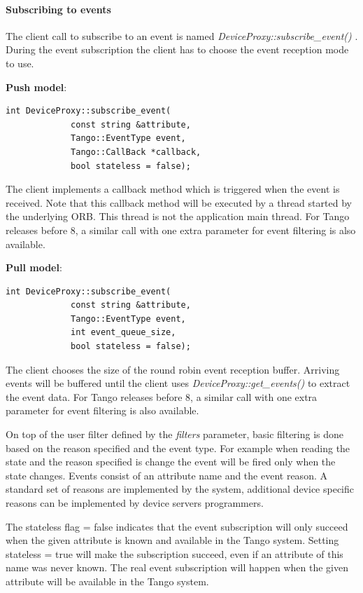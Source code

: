 \paragraph{Subscribing to events}

The client call to subscribe to an event is named \emph{DeviceProxy::subscribe\_event()}
. During the event subscription the client has to choose the event
reception mode to use. 

\textbf{Push model}:
\begin{verbatim}
int DeviceProxy::subscribe_event( 
             const string &attribute, 
             Tango::EventType event, 
             Tango::CallBack *callback,
             bool stateless = false);
\end{verbatim}
The client implements a callback method which is triggered when the
event is received. Note that this callback method will be executed
by a thread started by the underlying ORB. This thread is not the
application main thread. For Tango releases before 8, a similar call
with one extra parameter for event filtering is also available.

\textbf{Pull model}:
\begin{verbatim}
int DeviceProxy::subscribe_event( 
             const string &attribute, 
             Tango::EventType event, 
             int event_queue_size,
             bool stateless = false);
\end{verbatim}
The client chooses the size of the round robin event reception buffer.
Arriving events will be buffered until the client uses \emph{DeviceProxy::get\_events()}
to extract the event data. For Tango releases before 8, a similar
call with one extra parameter for event filtering is also available.

On top of the user filter defined by the \emph{filters} parameter,
basic filtering is done based on the reason specified and the event
type. For example when reading the state and the reason specified
is \textquotedbl{}change\textquotedbl{} the event will be fired only
when the state changes. Events consist of an attribute name and the
event reason. A standard set of reasons are implemented by the system,
additional device specific reasons can be implemented by device servers
programmers. 

The stateless flag = false indicates that the event subscription will
only succeed when the given attribute is known and available in the
Tango system. Setting stateless = true will make the subscription
succeed, even if an attribute of this name was never known. The real
event subscription will happen when the given attribute will be available
in the Tango system.

